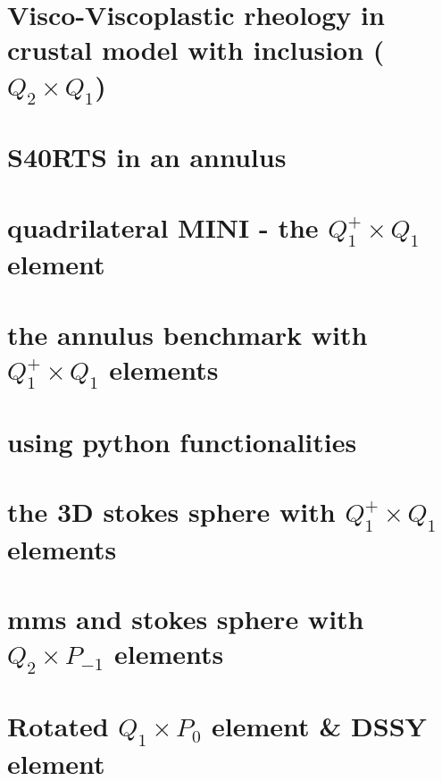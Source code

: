\documentclass[a4paper,11pt]{report}
\begin{document}
\chapter{Visco-Viscoplastic rheology in crustal model with inclusion ($Q_2\times Q_1$) \label{f70}} 

\chapter{S40RTS in an annulus \label{f71}} 

\chapter{quadrilateral MINI - the $Q_1^+\times Q_1$ element \label{f72}} 

\chapter{the annulus benchmark with $Q_1^+\times Q_1$ elements \label{f74}}

\chapter{using python functionalities\label{f73}} 

\chapter{the 3D stokes sphere with $Q_1^+\times Q_1$ elements \label{f75}}

\chapter{mms and stokes sphere with $Q_2\times P_{-1}$ elements \label{f76}}

\chapter{Rotated $Q_1\times P_0$ element \& DSSY element \label{f77}}
\end{document}
